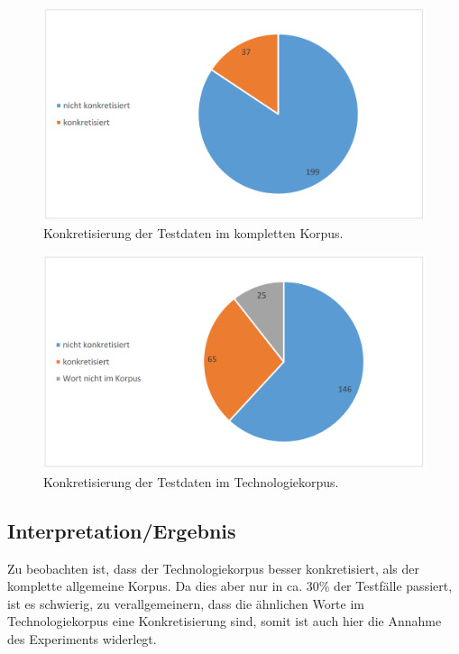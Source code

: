\documentclass[12pt,a4paper]{report}
\begin{document}
\begin{figure}[p]
  \begin{center}
	\includegraphics[scale=0.4]{KonkretisierungFull.PNG}
  \end{center}  
  \caption{Konkretisierung der Testdaten im kompletten Korpus.}

\end{figure}
\begin{figure}[p]
  \begin{center}
	\includegraphics[scale=0.4]{KonkretisierungTech.PNG}
  \end{center}  
  \caption{Konkretisierung der Testdaten im Technologiekorpus.}
  \end{figure}	
		\newpage
		\subsection{Interpretation/Ergebnis}
		Zu beobachten ist, dass der Technologiekorpus besser konkretisiert, als der komplette allgemeine Korpus. Da dies aber nur in ca. 30\% der Testfälle passiert, ist es schwierig, zu verallgemeinern, dass die ähnlichen Worte im Technologiekorpus eine Konkretisierung sind, somit ist auch hier die Annahme des Experiments widerlegt.
		
\end{document}

